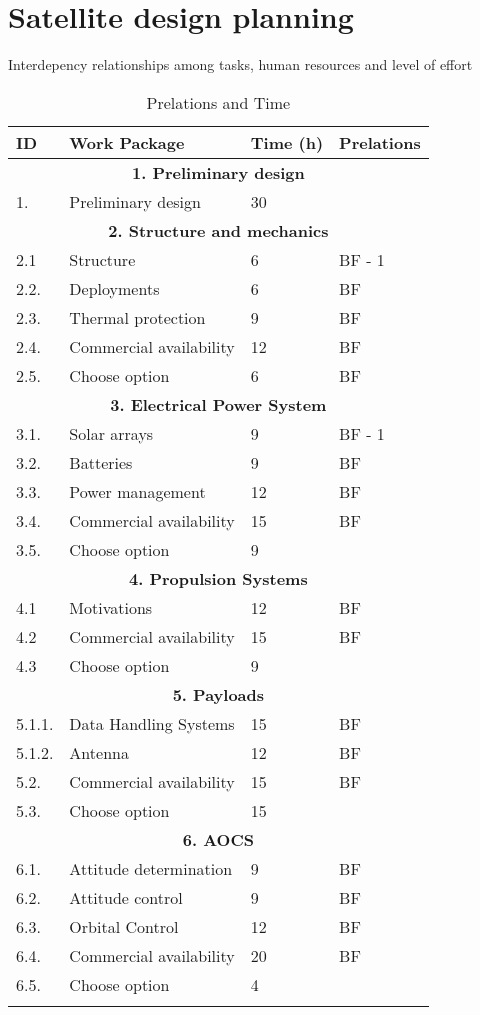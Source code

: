 \section{Satellite design planning}
Interdepency relationships among tasks, human resources and level of effort

\begin{longtable}{ | p{1.3cm} | p{7cm} | p{3cm} | p{3.5cm} |}
	\hline
	
	\textbf{ID }& \textbf{Work Package} & \textbf{Time (h)} & \textbf{Prelations} \\ \hline
	\multicolumn{4}{|c|}{\textbf{1. Preliminary design}} \\ \hline
	1. & Preliminary design & 30 &   \\ \hline
	\multicolumn{4}{|c|}{\textbf{2. Structure and mechanics}} \\ \hline
	2.1 & Structure & 6 & BF - 1 \\ \hline
	2.2. & Deployments & 6 & BF \\ \hline
	2.3. & Thermal protection & 9 & BF \\ \hline
	2.4. & Commercial availability & 12 & BF \\ \hline
	2.5. & Choose option & 6 & BF \\ \hline
	\multicolumn{4}{|c|}{\textbf{3. Electrical Power System}} \\ \hline
	3.1. & Solar arrays & 9 & BF - 1 \\ \hline
	3.2. & Batteries & 9 & BF \\ \hline
	3.3. & Power management & 12 & BF \\ \hline
	3.4. & Commercial availability & 15 & BF\\ \hline
	3.5. & Choose option & 9 & \\ \hline
	\multicolumn{4}{|c|}{\textbf{4. Propulsion Systems}} \\ \hline
	4.1 & Motivations & 12 & BF  \\ \hline
	4.2 & Commercial availability & 15 & BF  \\ \hline
	4.3 & Choose option & 9 &   \\ \hline
	\multicolumn{4}{|c|}{\textbf{5. Payloads}} \\ \hline
	5.1.1. & Data Handling Systems & 15 & BF \\ \hline
	5.1.2. & Antenna & 12 & BF \\ \hline
	5.2. & Commercial availability & 15 & BF  \\ \hline
	5.3. & Choose option & 15 & \\ \hline
	\multicolumn{4}{|c|}{\textbf{6. AOCS}} \\ \hline
	6.1. & Attitude determination& 9 & BF  \\ \hline
	6.2. & Attitude control & 9 & BF\\ \hline
	6.3. & Orbital Control & 12 & BF \\ \hline
	6.4. & Commercial availability  & 20 & BF \\ \hline
	6.5. & Choose option & 4 &  \\ \hline
	\caption{Prelations and Time} \\
\end{longtable}